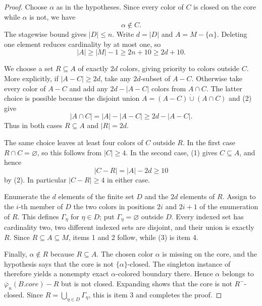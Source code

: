 \begin{proof}
Choose $\alpha$ as in the hypotheses.  Since every color of $C$ is closed
on the core while $\alpha$ is not, we have
\[
                              \alpha\notin C.                 \tag{1}
\]
The stagewise bound  gives
$|D|\leq n$.  Write $d=|D|$ and $A=M-\{\alpha\}$.  Deleting one element
reduces cardinality by at most one, so
\[
                  |A|\geq |M|-1\geq2n+10\geq2d+10.           \tag{2}
\]

We choose a set $R\subseteq A$ of exactly $2d$ colors, giving priority to
colors outside $C$.  More explicitly, if $|A-C|\geq2d$, take any
$2d$-subset of $A-C$.  Otherwise take every color of $A-C$ and add any
$2d-|A-C|$ colors from $A\cap C$.  The latter choice is possible because
the disjoint union
$A=(A-C)\mathbin{\dot\cup}(A\cap C)$ and (2) give
\[
 |A\cap C|=|A|-|A-C|\geq2d-|A-C|.
\]
Thus in both cases $R\subseteq A$ and $|R|=2d$.

The same choice leaves at least four colors of $C$ outside $R$.  In the
first case $R\cap C=\varnothing$, so this follows from $|C|\geq4$.  In the
second case, (1) gives $C\subseteq A$, and hence
\[
 |C-R|=|A|-2d\geq10                                             \tag{3}
\]
by (2).  In particular $|C-R|\geq4$ in either case.

Enumerate the $d$ elements of the finite set $D$ and the $2d$ elements of
$R$.  Assign to the $i$-th member of $D$ the two colors in positions
$2i$ and $2i+1$ of the enumeration of $R$.  This defines
$\Gamma_\eta$ for $\eta\in D$; put $\Gamma_\eta=\varnothing$ outside
$D$.  Every indexed set has cardinality two, two different indexed sets
are disjoint, and their union is exactly $R$.  Since $R\subseteq A\subseteq
M$, items 1 and 2 follow, while (3) is item 4.

Finally, $\alpha\notin R$ because $R\subseteq A$.  The chosen color
$\alpha$ is missing on the core, and the hypothesis says that the core is
not $\{\alpha\}$-closed.  The singleton instance of
 therefore yields a nonempty exact
$\alpha$-colored boundary there.  Hence $\alpha$ belongs to
$\overline\varphi_n(B.\mathit{core})-R$ but is not closed.  Expanding
 shows that the core is not
$R^-$-closed.  Since $R=\bigcup_{\eta\in D}\Gamma_\eta$, this is item 3
and completes the proof.
\end{proof}

